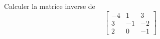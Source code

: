 Calculer la matrice inverse de
  \[
  \left[
  \begin{array}{ccc}
  	-4 & 1 & 3 \\
	  3 & -1 & -2 \\
	  2 & 0 & -1
  \end{array}
  \right]
  \] 
  \bigskip \bigskip \bigskip \bigskip \bigskip
